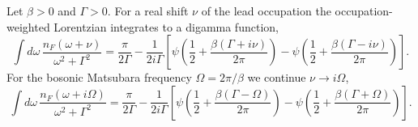 \documentclass{article}
\begin{document}
Let $\beta>0$ and $\Gamma>0$. For a real shift $\nu$ of the lead occupation the occupation-weighted
Lorentzian integrates to a digamma function,
\begin{equation}
\int d\omega\, \frac{n_F(\omega+\nu)}{\omega^2+\Gamma^2} = \frac{\pi}{2\Gamma} - \frac{1}{2i\Gamma}\left[\psi\left(\frac{1}{2}+\frac{\beta(\Gamma+i\nu)}{2\pi}\right)-\psi\left(\frac{1}{2}+\frac{\beta(\Gamma-i\nu)}{2\pi}\right)\right] .
\label{eq:real}
\end{equation}
For the bosonic Matsubara frequency $\Omega = 2\pi/\beta$ we continue $\nu \to i\Omega$,
\begin{equation}
\int d\omega\, \frac{n_F(\omega+i\Omega)}{\omega^2+\Gamma^2} = \frac{\pi}{2\Gamma} - \frac{1}{2i\Gamma}\left[\psi\left(\frac{1}{2}+\frac{\beta(\Gamma-\Omega)}{2\pi}\right)-\psi\left(\frac{1}{2}+\frac{\beta(\Gamma+\Omega)}{2\pi}\right)\right] .
\label{eq:imag}
\end{equation}
\end{document}
